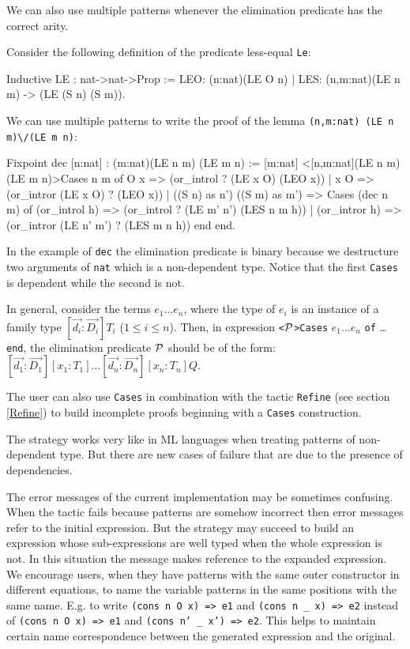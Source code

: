 We can also use multiple patterns whenever the elimination predicate has
the correct arity. 

Consider the following definition of the predicate less-equal
\texttt{Le}:

\begin{coq_example}
Inductive LE : nat->nat->Prop :=
  LEO: (n:nat)(LE O n)
| LES: (n,m:nat)(LE n m) -> (LE (S n) (S m)).
\end{coq_example}

We can use multiple patterns to write  the proof of the lemma
 \texttt{(n,m:nat) (LE n m)}\verb=\/=\texttt{(LE m n)}:

\begin{coq_example}
Fixpoint dec  [n:nat] : (m:nat)(LE n m) \/ (LE m n) :=
 [m:nat] <[n,m:nat](LE n m) \/ (LE m n)>Cases n m of
           O   x =>  (or_introl ? (LE x O) (LEO x))
         | x   O =>  (or_intror (LE x O) ? (LEO x))
         | ((S n) as n') ((S m) as m') =>
              Cases (dec n m) of
                  (or_introl h) => (or_introl ? (LE m' n') (LES n m h))
               |  (or_intror h) => (or_intror (LE n' m') ? (LES m n h))
              end
        end.
\end{coq_example}
In the example of \texttt{dec} the elimination predicate is binary
because we destructure two arguments of \texttt{nat} which is a
non-dependent type. Notice that the first \texttt{Cases} is dependent while 
the second is not.

In general, consider the terms $e_1\ldots e_n$,
where  the type of $e_i$ is an instance of a family type
$[\vec{d_i}:\vec{D_i}]T_i$  ($1\leq i
\leq n$). Then, in expression \texttt{<}${\cal P}$\texttt{>Cases}  $e_1\ldots
e_n$ \texttt{of} \ldots \texttt{end}, the 
elimination predicate ${\cal P}$ should be of the form:
$[\vec{d_1}:\vec{D_1}][x_1:T_1]\ldots [\vec{d_n}:\vec{D_n}][x_n:T_n]Q.$

The user can also use \texttt{Cases} in combination with the tactic
\texttt{Refine} (see section \ref{Refine}) to build incomplete proofs
beginning with a \texttt{Cases} construction.

\label{limitations}
The strategy works very like in ML languages when treating
patterns of non-dependent type.  
But there are new cases of failure that are due to the presence of 
dependencies. 

The error messages of the current implementation may be sometimes
confusing.  When the tactic fails because patterns are somehow
incorrect then error messages refer to the initial expression. But the
strategy may succeed to build an expression whose sub-expressions are
well typed when the whole expression is not. In this situation the
message makes reference to the expanded expression.  We encourage
users, when they have patterns with the same outer constructor in
different equations, to name the variable patterns in the same
positions with the same name.  
E.g. to write {\small\texttt{(cons n O x) => e1}} 
and {\small\texttt{(cons n \_ x) => e2}} instead of
{\small\texttt{(cons n O x) => e1}} and 
{\small\texttt{(cons n' \_ x') => e2}}. 
This helps to maintain certain name correspondence between the
generated expression and the original.

